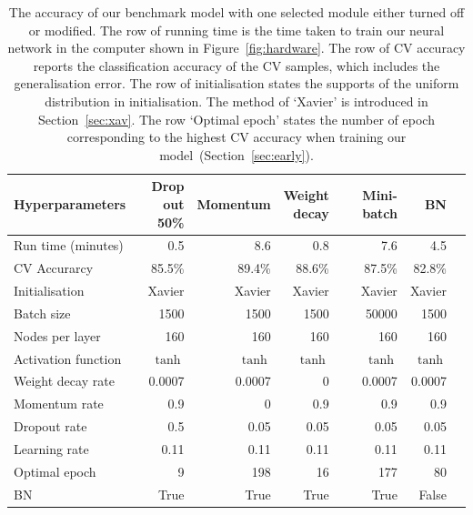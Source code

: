 \begin{table}
\caption{The accuracy of our benchmark model with one selected module either turned off or modified. The row of running time is the time taken to train our neural network in the computer shown in Figure~\ref{fig:hardware}. The row of CV accuracy reports the classification accuracy of the CV samples, which includes the generalisation error. The row of initialisation states the supports of the uniform distribution in initialisation. The method of `Xavier' is introduced in Section~\ref{sec:xav}. The row `Optimal epoch' states the number of epoch corresponding to the highest CV accuracy when training our model~(Section~\ref{sec:early}).
\label{tb:comp}}
\centering
{\centering
\begin{tabular}{@{}lrrrrrr@{}}
\toprule
Hyperparameters             & {\parbox[t]{1.5cm}{\raggedleft Drop \\out 50\%}  } 
& Momentum & {\parbox[t]{1.3cm}{\raggedleft Weight \\decay}} & Mini-batch & BN \\ \midrule
Run time (minutes)             & 0.5        & 8.6          & 0.8      & 7.6 & 4.5          \\
CV Accurarcy                   & 85.5\%     & 89.4\%       & 88.6\%   & 87.5\% &82.8\%       \\
Initialisation              & Xavier     & Xavier       & Xavier   & Xavier & Xavier        \\
Batch size                   & 1500       & 1500         & 1500     & 50000    & 1500        \\
Nodes per layer        & 160        & 160          & 160      & 160    & 160         \\
Activation function        & $\tanh$    & $\tanh$      & $\tanh$  & $\tanh$  & $\tanh$       \\
Weight decay rate          & 0.0007     & 0.0007       & 0        & 0.0007  & 0.0007        \\
Momentum rate                & 0.9        & 0            & 0.9      & 0.9    & 0.9         \\
Dropout rate                & 0.5        & 0.05         & 0.05     & 0.05    & 0.05        \\
Learning rate                & 0.11       & 0.11         & 0.11     & 0.11    & 0.11       \\
Optimal epoch       & 9          & 198          & 16       & 177     & 80       \\ 
BN       & True          & True          & True       & True     & False       \\ \bottomrule
\end{tabular}
}
\end{table}

